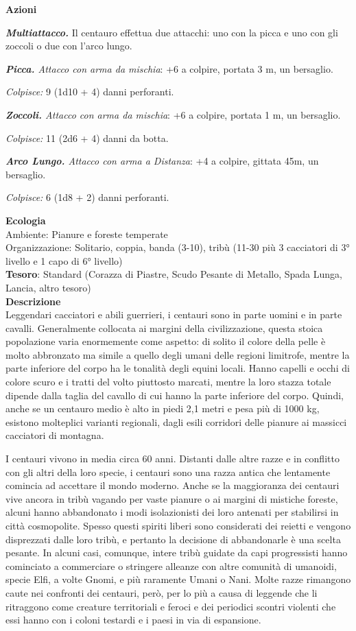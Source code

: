 \begin{multicols}{2}
	\textbf{Azioni}

	\textit{\textbf{Multiattacco.}} Il centauro effettua due attacchi: uno con la picca e uno con gli zoccoli o due con l'arco lungo.

	\textit{\textbf{Picca.} Attacco con arma da mischia}: +6 a colpire, portata 3 m, un bersaglio.

	\textit{Colpisce:} 9 (1d10 + 4) danni perforanti.

	\textit{\textbf{Zoccoli.} Attacco con arma da mischia}: +6 a colpire, portata 1 m, un bersaglio.

	\textit{Colpisce:} 11 (2d6 + 4) danni da botta.

	\textit{\textbf{Arco Lungo.} Attacco con arma a Distanza}: +4 a colpire, gittata 45m, un bersaglio.

	\textit{Colpisce:} 6 (1d8 + 2) danni perforanti.

	\textbf{Ecologia}\\
	Ambiente: Pianure e foreste temperate\\
	Organizzazione: Solitario, coppia, banda (3-10), tribù (11-30 più 3 cacciatori di 3° livello e 1 capo di 6° livello)\\
	\textbf{Tesoro}: Standard (Corazza di Piastre, Scudo Pesante di Metallo, Spada Lunga, Lancia, altro tesoro)\\
	\textbf{Descrizione}\\
	Leggendari cacciatori e abili guerrieri, i centauri sono in parte uomini e in parte cavalli. Generalmente collocata ai margini della civilizzazione, questa stoica popolazione varia enormemente come aspetto: di solito il colore della pelle è molto abbronzato ma simile a quello degli umani delle regioni limitrofe, mentre la parte inferiore del corpo ha le tonalità degli equini locali. Hanno capelli e occhi di colore scuro e i tratti del volto piuttosto marcati, mentre la loro stazza totale dipende dalla taglia del cavallo di cui hanno la parte inferiore del corpo. Quindi, anche se un centauro medio è alto in piedi 2,1 metri e pesa più di 1000 kg, esistono molteplici varianti regionali, dagli esili corridori delle pianure ai massicci cacciatori di montagna.

	I centauri vivono in media circa 60 anni. Distanti dalle altre razze e in conflitto con gli altri della loro specie, i centauri sono una razza antica che lentamente comincia ad accettare il mondo moderno. Anche se la maggioranza dei centauri vive ancora in tribù vagando per vaste pianure o ai margini di mistiche foreste, alcuni hanno abbandonato i modi isolazionisti dei loro antenati per stabilirsi in città cosmopolite. Spesso questi spiriti liberi sono considerati dei reietti e vengono disprezzati dalle loro tribù, e pertanto la decisione di abbandonarle è una scelta pesante. In alcuni casi, comunque, intere tribù guidate da capi progressisti hanno cominciato a commerciare o stringere alleanze con altre comunità di umanoidi, specie Elfi, a volte Gnomi, e più raramente Umani o Nani. Molte razze rimangono caute nei confronti dei centauri, però, per lo più a causa di leggende che li ritraggono come creature territoriali e feroci e dei periodici scontri violenti che essi hanno con i coloni testardi e i paesi in via di espansione.


\end{multicols}
